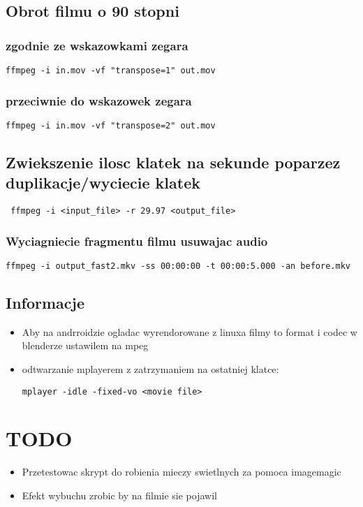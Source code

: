 \documentclass[a4paper,10pt]{article}
\begin{document}
\subsection{Obrot filmu o 90 stopni}
\subsubsection{zgodnie ze wskazowkami zegara}
\begin{verbatim}
ffmpeg -i in.mov -vf "transpose=1" out.mov
\end{verbatim}
\subsubsection{przeciwnie do wskazowek zegara}
\begin{verbatim}
ffmpeg -i in.mov -vf "transpose=2" out.mov
\end{verbatim}

\subsection{Zwiekszenie ilosc klatek na sekunde poparzez duplikacje/wyciecie klatek}
\begin{verbatim}
 ffmpeg -i <input_file> -r 29.97 <output_file>
\end{verbatim}

\subsubsection{Wyciagniecie fragmentu filmu usuwajac audio}
\begin{verbatim}
ffmpeg -i output_fast2.mkv -ss 00:00:00 -t 00:00:5.000 -an before.mkv
\end{verbatim}

\subsection{Informacje}
\begin{itemize}
\item Aby na andrroidzie ogladac wyrendorowane z linuxa filmy to format i codec w blenderze ustawilem na mpeg
\item odtwarzanie mplayerem z zatrzymaniem na ostatniej klatce:
\begin{verbatim}
mplayer -idle -fixed-vo <movie file>
\end{verbatim}
\end{itemize}

\section{TODO}
\begin{itemize}
\item Przetestowac skrypt do robienia mieczy swietlnych za pomoca imagemagic
\item Efekt wybuchu zrobic by na filmie sie pojawil
\end{itemize}
\end{document}
